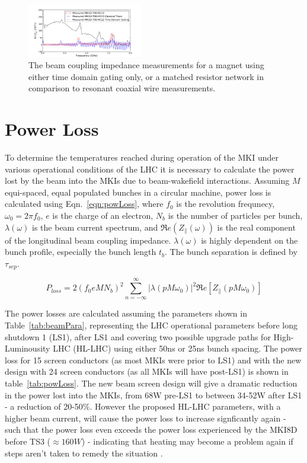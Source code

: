 \documentclass[a4paper,
              ]{jacow}
\begin{document}
\begin{figure}
\includegraphics[width=0.45\textwidth]{compMeasurementGating.pdf}
\caption{The beam coupling impedance measurements for a magnet using either time domain gating only, or a matched resistor network in comparison to resonant coaxial wire measurements.}
\label{fig:measComp}
\end{figure}

\section{Power Loss}

To determine the temperatures reached during operation of the MKI under various operational conditions of the LHC it is necessary to calculate the power lost by the beam into the MKIs due to beam-wakefield interactions. Assuming $M$ equi-spaced, equal populated bunches in a circular machine, power loss is calculated using Eqn.~\ref{eqn:powLoss}, where $f_{0}$ is the revolution frequnecy, $\omega_{0}=2\pi f_{0}$, $e$ is the charge of an electron, $N_{b}$ is the number of particles per bunch, $\lambda(\omega)$ is the beam current spectrum, and $\Re{}e(Z_{\parallel}(\omega))$ is the real component of the longitudinal beam coupling impedance. $\lambda(\omega)$ is highly dependent on the bunch profile, especially the bunch length $t_{b}$. The bunch separation is defined by $\tau_{sep}$.

\begin{equation}
P_{loss} = 2 \left( f_{0} e M  N_{b}\right)^{2} \displaystyle\sum\limits_{n = -\infty}^{\infty}  \left| \lambda \left( p M \omega_{0} \right)  \right|^{2} \Re{}e \left[ Z_{\parallel} \left( p M \omega_{0} \right) \right]
\label{eqn:powLoss}
\end{equation}

The power losses are calculated assuming the parameters shown in Table~\ref{tab:beamPara}, representing the LHC operational parameters before long shutdown 1 (LS1), after LS1 and covering two possible upgrade paths for High-Luminousity LHC (HL-LHC) using either 50ns or 25ns bunch spacing. The power loss for 15 screen conductors (as most MKIs were prior to LS1) and with the new design with 24 screen conductors (as all MKIs will have post-LS1) is shown in table~\ref{tab:powLoss}. The new beam screen design will give a dramatic reduction in the power lost into the MKIs, from 68W pre-LS1 to between 34-52W after LS1 - a reduction of 20-50\%. However the proposed HL-LHC parameters, with a higher beam current, will cause the power loss to increase signficantly again - such that the power loss even exceeds the power loss experienced by the MKI8D before TS3 ($\approx 160W$) - indicating that heating may become a problem again if steps aren't taken to remedy the situation \cite{mkiCoolling}.
\end{document}
